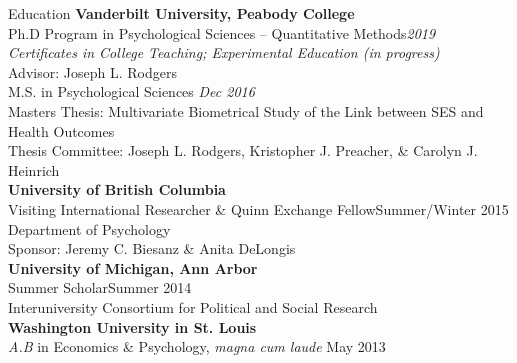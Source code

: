 \begin{rSection}{\textrm{Education}}
{\bf Vanderbilt University, Peabody College}\\
Ph.D Program in Psychological Sciences -- Quantitative Methods\hfill{\em 2019} \\
\hspace*{\pindent}\textit{Certificates in College Teaching; Experimental Education (in progress)}\\
\hspace*{\pindent}Advisor: Joseph L. Rodgers%
\smallskip\\
M.S. in Psychological Sciences \hfill{\em Dec 2016} \\
\hspace*{\pindent}Masters Thesis: Multivariate Biometrical Study of the Link between SES and Health Outcomes\\
\hspace*{\pindent}Thesis Committee: Joseph L. Rodgers, Kristopher J. Preacher, \& Carolyn J. Heinrich %
\medskip\\
\textbf{University of British Columbia}\\
Visiting International Researcher \& Quinn Exchange Fellow\hfill{Summer/Winter 2015}\\
\hspace*{\pindent}Department of Psychology\\
\hspace*{\pindent}Sponsor: Jeremy C. Biesanz \& Anita DeLongis\medskip\\
\textbf{University of Michigan, Ann Arbor}\\
Summer Scholar\hfill{Summer 2014}\\
\hspace*{\pindent}Interuniversity Consortium for Political and Social Research\medskip\\
{\bf Washington University in St. Louis}\\
{\em A.B} in Economics \& Psychology, \textit{magna cum laude} \hfill{May 2013}%
\end{rSection}